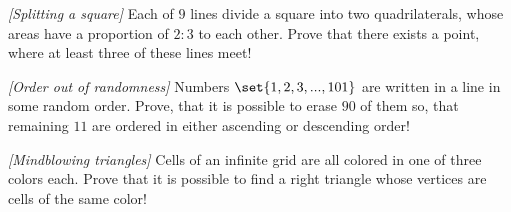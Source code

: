 \begin{problem}
\textit{[Splitting a square]}
Each of $9$ lines divide a square into two quadrilaterals, whose areas have a proportion of $2:3$ to each other. Prove that there exists a point, where at least three of these lines meet!
\end{problem}
%

\begin{problem}
\textit{[Order out of randomness]}
Numbers $\set{1,2,3,...,101}$ are written in a line in some random order. Prove, that it is possible to erase $90$ of them so, that remaining $11$ are ordered in either ascending or descending order!
\end{problem}
%

\begin{problem}
\textit{[Mindblowing triangles]}
Cells of an infinite grid are all colored in one of three colors each. Prove that it is possible to find a right triangle whose vertices are cells of the same color!
\end{problem}
%


